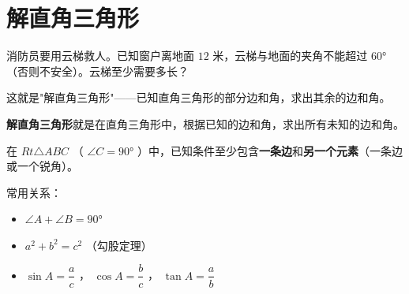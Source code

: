 \section*{解直角三角形}


\begin{explore}


消防员要用云梯救人。已知窗户离地面 $12$ 米，云梯与地面的夹角不能超过 $60°$ （否则不安全）。云梯至少需要多长？

这就是"解直角三角形"——已知直角三角形的部分边和角，求出其余的边和角。

\end{explore}

\begin{understand}


\textbf{解直角三角形}就是在直角三角形中，根据已知的边和角，求出所有未知的边和角。

在 $Rt\triangle ABC$ （ $\angle C = 90°$ ）中，已知条件至少包含\textbf{一条边}和\textbf{另一个元素}（一条边或一个锐角）。

常用关系：
\begin{itemize}
  \item $\angle A + \angle B = 90°$
  \item $a^2 + b^2 = c^2$ （勾股定理）
  \item $\sin A = \dfrac{a}{c}$ ， $\cos A = \dfrac{b}{c}$ ， $\tan A = \dfrac{a}{b}$
\end{itemize}


\end{understand}

